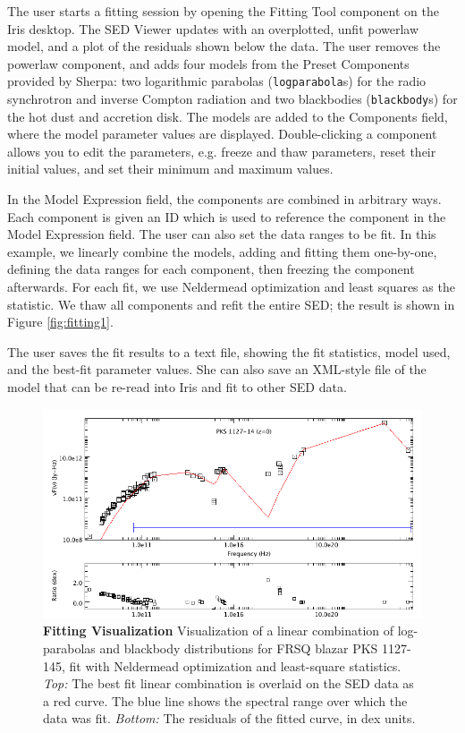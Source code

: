\documentclass[5p]{elsarticle}
\begin{document}
The user starts a fitting session by opening the Fitting Tool component on the Iris desktop. The SED Viewer updates with an overplotted, unfit powerlaw model, and a plot of the residuals shown below the data. The user removes the powerlaw component, and adds four models from the Preset Components provided by Sherpa: two logarithmic parabolas (\texttt{logparabola}s) for the radio synchrotron and inverse Compton radiation and two blackbodies (\texttt{blackbody}s) for the hot dust and accretion disk. The models are added to the Components field, where the model parameter values are displayed. Double-clicking a component allows you to edit the parameters, e.g. freeze and thaw parameters, reset their initial values, and set their minimum and maximum values. 

In the Model Expression field, the components are combined in arbitrary ways. Each component is given an ID which is used to reference the component in the Model Expression field. The user can also set the data ranges to be fit. In this example, we linearly combine the models, adding and fitting them one-by-one, defining the data ranges for each component, then freezing the component afterwards. For each fit, we use Neldermead optimization and least squares as the statistic. We thaw all components and refit the entire SED; the result is shown in Figure \ref{fig:fitting1}. 

The user saves the fit results to a text file, showing the fit statistics, model used, and the best-fit parameter values. She can also save an XML-style file of the model that can be re-read into Iris and fit to other SED data.

\begin{figure}
\begin{center}
\includegraphics[width=\columnwidth]{figures/all-models-plot-only2.png}
\caption{\textbf{\label{fig:fitting} Fitting Visualization} Visualization of a linear combination of log-parabolas and blackbody distributions for FRSQ blazar PKS 1127-145, fit with Neldermead optimization and least-square statistics. \textit{Top:} The best fit linear combination is overlaid on the SED data as a red curve. The blue line shows the spectral range over which the data was fit. \textit{Bottom:} The residuals of the fitted curve, in dex units.}
\end{center}
\end{figure}
\end{document}
